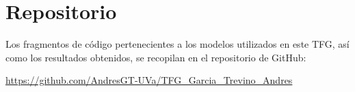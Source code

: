 \chapter{Repositorio}
Los fragmentos de código pertenecientes a los modelos utilizados en este TFG, así como los resultados obtenidos, se recopilan en el repositorio de GitHub:

\url{https://github.com/AndresGT-UVa/TFG_Garcia_Trevino_Andres}